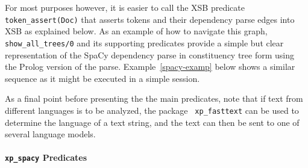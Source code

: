 For most purposes however, it is easier to call the XSB predicate {\tt
  token\_assert(Doc)} that asserts tokens and their dependency parse
edges into XSB as explained below.  As an example of how to navigate
this graph, {\tt show\_all\_trees/0} and its supporting predicates
provide a simple but clear representation of the SpaCy dependency
parse in constituency tree form using the Prolog version of the parse.
Example~\ref{spacy-examp} below shows a similar sequence as it might
be executed in a simple session.



As a final point before presenting the the main predicates, note that
if text from different languages is to be analyzed, the package {\tt
  xp\_fasttext} can be used to determine the language of a text
string, and the text can then be sent to one of several language
models. 

\paragraph{{\tt xp\_spacy} Predicates}

